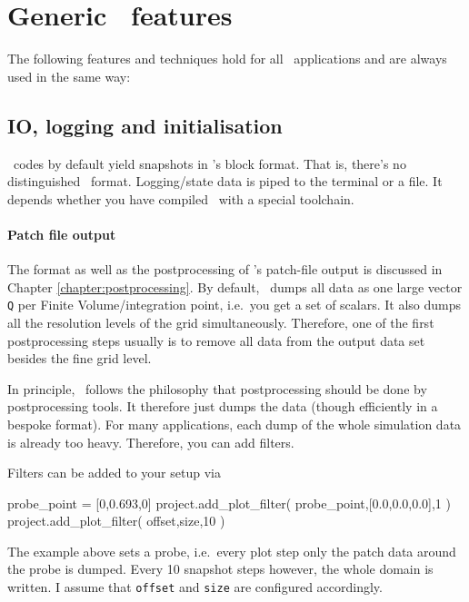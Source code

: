 \section{Generic \ExaHyPE\ features}

The following features and techniques hold for all \ExaHyPE\ applications and
are always used in the same way:

\subsection{IO, logging and initialisation}


\ExaHyPE\ codes by default yield snapshots in \Peano's block format. 
That is, there's no distinguished \ExaHyPE\ format. 
Logging/state data is piped to the terminal or a file. 
It depends whether you have compiled \Peano\ with a special toolchain.


\paragraph{Patch file output}

The format as well as the postprocessing of \Peano's patch-file output is
discussed in Chapter \ref{chapter:postprocessing}.
By default, \ExaHyPE\ dumps all data as one large vector \texttt{Q} per Finite
Volume/integration point, i.e.~you get a set of scalars.
It also dumps all the resolution levels of the grid simultaneously.
Therefore, one of the first postprocessing steps usually is to remove all data
from the output data set besides the fine grid level.


\begin{remark}
 In principle, \Peano\ follows the philosophy that postprocessing should be done
 by postprocessing tools. It therefore just dumps the data (though efficiently
 in a bespoke format). For many applications, each dump of the whole
 simulation data is already too heavy. Therefore, you can add filters.
\end{remark}

\noindent
Filters can be added to your setup via
\begin{code}
probe_point = [0,0.693,0]
project.add_plot_filter( probe_point,[0.0,0.0,0.0],1 )
project.add_plot_filter( offset,size,10 )
\end{code}

\noindent
The example above sets a probe, i.e.~every plot step only the patch data around
the probe is dumped. Every 10 snapshot steps however, the whole domain is
written.
I assume that \texttt{offset} and \texttt{size} are configured accordingly.


